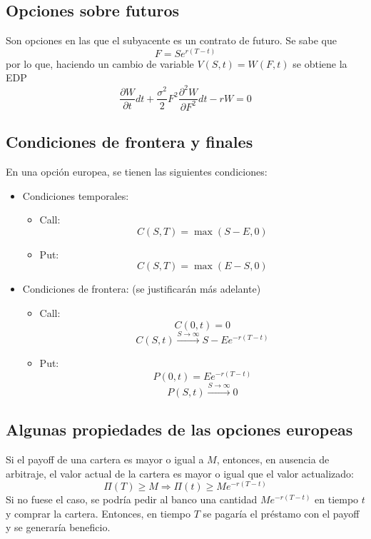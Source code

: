 \subsection{Opciones sobre futuros}
Son opciones en las que el subyacente es un contrato de futuro. Se sabe que
$$F = Se^{r(T-t)}$$
por lo que, haciendo un cambio de variable $V(S,t) = W(F,t)$ se obtiene la EDP
$$\boxed{\frac{\partial W}{\partial t}dt + \frac{\sigma^2}{2}F^2 \frac{\partial^2 W}{\partial F^2}dt - rW    = 0}$$




\subsection{Condiciones de frontera y finales}
En una opción europea, se tienen las siguientes condiciones:
\begin{itemize}
    \item Condiciones temporales:
    \begin{itemize}
        \item Call:
        $$\boxed{C(S,T) = \max(S-E, 0)}$$
        \item Put:
        $$\boxed{C(S,T) = \max(E-S, 0)}$$
    \end{itemize}
    \item Condiciones de frontera: (se justificarán más adelante)
    \begin{itemize}
        \item Call:
        $$\boxed{C(0,t) = 0}$$
        $$\boxed{C(S,t) \xrightarrow{S\rightarrow\infty}  S - Ee^{-r(T-t)}}$$
        \item Put:
        $$\boxed{P(0,t) = Ee^{-r(T-t)}}$$
        $$\boxed{P(S,t) \xrightarrow{S\rightarrow\infty}  0}$$
    \end{itemize}
\end{itemize}






\subsection{Algunas propiedades de las opciones europeas}

\begin{remark} \label{ActPayoff}
    Si el payoff de una cartera es mayor o igual a $M$, entonces, en ausencia de arbitraje, el valor actual de la cartera es mayor o igual que el valor actualizado:
    $$\boxed{\Pi(T) \geq M \Rightarrow \Pi(t) \geq Me^{-r(T-t)}}$$
    Si no fuese el caso, se podría pedir al banco una cantidad $Me^{-r(T-t)}$ en tiempo $t$ y comprar la cartera. Entonces, en tiempo $T$ se pagaría el préstamo con el payoff y se generaría beneficio.
\end{remark}


